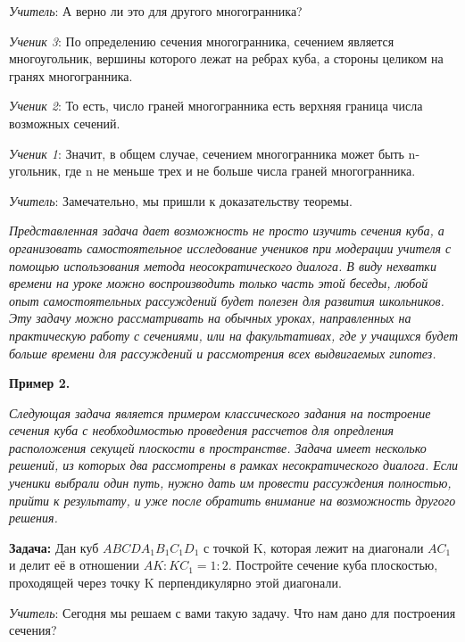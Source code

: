 \documentclass[a4paper,14pt,russian]{extreport}
\newcommand{\capt}[1]{%
    \\[8pt]
    \text{Рис. #1}
}
\begin{document}
\textit{Учитель}: А верно ли это для другого многогранника?

\textit{Ученик 3}: По определению сечения многогранника, сечением является многоугольник, вершины которого лежат на ребрах куба, а стороны целиком на гранях многогранника.

\textit{Ученик 2}: То есть, число граней многогранника есть верхняя граница числа возможных сечений.

\textit{Ученик 1}: Значит, в общем случае, сечением многогранника может быть n-угольник, где n не меньше трех и не больше числа граней многогранника.

\textit{Учитель}: Замечательно, мы пришли к доказательству теоремы.

\textit{Представленная задача дает возможность не просто изучить сечения куба, а организовать самостоятельное исследование учеников при модерации учителя с помощью использования метода неосократического диалога. В виду нехватки времени на уроке можно воспроизводить только часть этой беседы, любой опыт самостоятельных рассуждений будет полезен для развития школьников. Эту задачу можно рассматривать на обычных уроках, направленных на практическую работу с сечениями, или на факультативах, где у учащихся будет больше времени для рассуждений и рассмотрения всех выдвигаемых гипотез.}

\textbf{Пример 2.}

\textit{Следующая задача является примером классического задания на построение сечения куба с необходимостью проведения рассчетов для опредления расположения секущей плоскости в пространстве. Задача имеет несколько решений, из которых два рассмотрены в рамках несократического диалога. Если ученики выбрали один путь, нужно дать им провести рассуждения полностью, прийти к результату, и уже после обратить внимание на возможность другого решения.}

\textbf{Задача:} Дан куб $ABCDA_1B_1C_1D_1$ с точкой K, которая лежит на диагонали $AC_1$ и делит её в отношении $AK:KC_1 = 1:2$. Постройте сечение куба плоскостью, проходящей через точку K перпендикулярно этой диагонали.

\vspace{0.3cm}
\textit{Учитель}: Сегодня мы решаем с вами такую задачу. Что нам дано для построения сечения?

\begin{center}
\hspace{-2cm}
    \begin{minipage}{0.3\textwidth}
        \centering
    \end{minipage}
    \capt{1}
\end{center}
\end{document}
